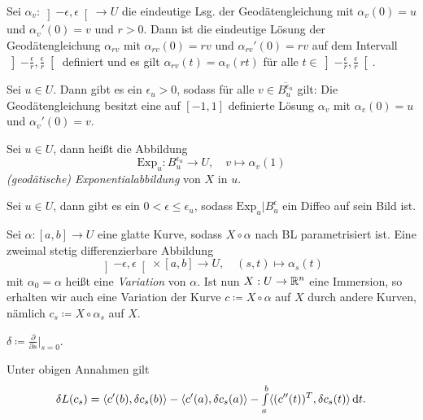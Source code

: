 \documentclass{cheat-sheet}
\newcommand{\Exp}{\mathrm{Exp}} %
\newcommand{\ointervall}[1]{\left]#1\right[} %
\begin{document}
\begin{satz}
  Sei $\alpha_v : \ointervall{-\epsilon, \epsilon} \to U$ die eindeutige Lsg. der Geodätengleichung mit $\alpha_v(0) = u$ und $\alpha_v'(0) = v$ und $r > 0$. Dann ist die eindeutige Lösung der Geodätengleichung $\alpha_{rv}$ mit $\alpha_{rv}(0) = rv$ und $\alpha_{rv}'(0) = rv$ auf dem Intervall $\ointervall{-\tfrac{\epsilon}{r}, \tfrac{\epsilon}{r}}$ definiert und es gilt
  $\alpha_{rv}(t) = \alpha_v(rt)$ für alle $t \in \ointervall{-\tfrac{\epsilon}{r}, \tfrac{\epsilon}{r}}$.
\end{satz}

\begin{satz}
  Sei $u \in U$. Dann gibt es ein $\epsilon_u > 0$, sodass für alle $v \in \overline{B_u^{\epsilon_u}}$ gilt: Die Geodätengleichung besitzt eine auf $[-1,1]$ definierte Lösung $\alpha_v$ mit $\alpha_v(0) = u$ und $\alpha_v'(0) = v$.
\end{satz}

\begin{definition}
  Sei $u \in U$, dann heißt die Abbildung
  \[ \Exp_u : B_u^{\epsilon_u} \to U, \quad v \mapsto \alpha_v(1) \]
  \emph{(geodätische) Exponentialabbildung} von $X$ in $u$.
\end{definition}

\begin{definition}
  Sei $u \in U$, dann gibt es ein $0 < \epsilon \leq \epsilon_u$, sodass $\Exp_u|B_u^\epsilon$ ein Diffeo auf sein Bild ist.
\end{definition}

\begin{definition}
  Sei $\alpha : [a, b] \to U$ eine glatte Kurve, sodass $X \circ \alpha$ nach BL parametrisiert ist. Eine zweimal stetig differenzierbare Abbildung
  \[ \ointervall{-\epsilon, \epsilon} \times [a, b] \to U, \quad (s, t) \mapsto \alpha_s(t) \]
  mit $\alpha_0 = \alpha$ heißt eine \emph{Variation} von $\alpha$. Ist nun $X : U \to \mathbb{R}^n$ eine Immersion, so erhalten wir auch eine Variation der Kurve $c \coloneqq X \circ \alpha$ auf $X$ durch andere Kurven, nämlich $c_s \coloneqq X \circ \alpha_s$ auf $X$.
\end{definition}

\begin{nota}
  $\delta \coloneqq \tfrac{\partial}{\partial s}|_{s=0}$.
\end{nota}

\begin{satz}
  Unter obigen Annahmen gilt
  \[ \delta L(c_s) = \langle c'(b), \delta c_s(b) \rangle - \langle c'(a), \delta c_s(a) \rangle - {\textstyle \int\limits_{a}^{b}} \langle (c''(t))^T, \delta c_s(t) \rangle \,\mathrm{d} t. \]
\end{satz}
\end{document}
